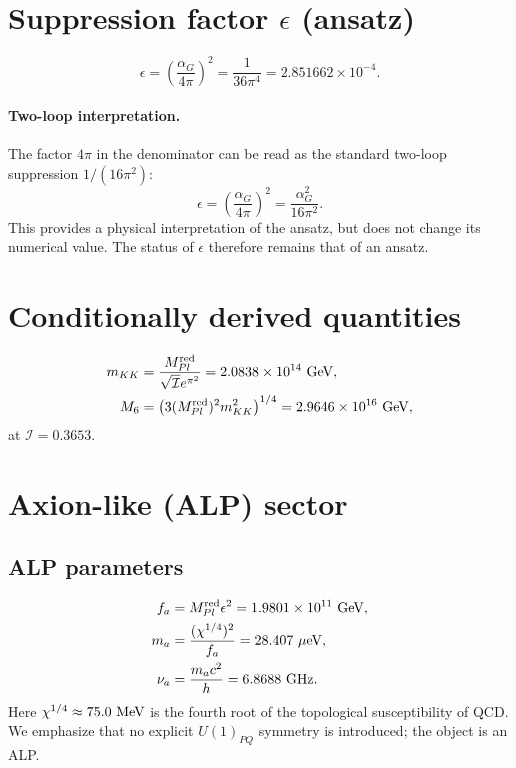 \documentclass[12pt,a4paper]{article}
\numberwithin{equation}{section}
\begin{document}
\section{Suppression factor \(\epsilon\) (ansatz)}
\begin{equation}
\epsilon = \left(\frac{\alpha_G}{4\pi}\right)^2 = \frac{1}{36\pi^4} = 2.851662\times 10^{-4}.
\end{equation}
\paragraph{Two-loop interpretation.}
The factor \(4\pi\) in the denominator can be read as the standard two-loop suppression \(1/(16\pi^2)\):
\begin{equation}
\epsilon = \left(\frac{\alpha_G}{4\pi}\right)^2 = \frac{\alpha_G^2}{16\pi^2}.
\end{equation}
This provides a physical interpretation of the ansatz, but does not change its numerical value. The status of \(\epsilon\) therefore remains that of an ansatz.

\section{Conditionally derived quantities}
\begin{align}
m_{KK} &= \frac{M_{Pl}^{\rm red}}{\sqrt{\mathcal{I}}e^{\pi^2}} = 2.0838\times 10^{14}~{\rm GeV}, \\
M_6 &= \left(3(M_{Pl}^{\rm red})^2 m_{KK}^2\right)^{1/4} = 2.9646\times 10^{16}~{\rm GeV},
\end{align}
at \(\mathcal{I} = 0.3653\).

\section{Axion-like (ALP) sector}
\subsection{ALP parameters}
\begin{align}
f_a &= M_{Pl}^{\rm red}\epsilon^2 = 1.9801\times 10^{11}~{\rm GeV}, \\
m_a &= \frac{(\chi^{1/4})^2}{f_a} = 28.407~\mu{\rm eV}, \\
\nu_a &= \frac{m_a c^2}{h} = 6.8688~{\rm GHz}.
\end{align}
Here \(\chi^{1/4}\approx 75.0~{\rm MeV}\) is the fourth root of the topological susceptibility of QCD. We emphasize that no explicit \(U(1)_{PQ}\) symmetry is introduced; the object is an ALP.
\end{document}

